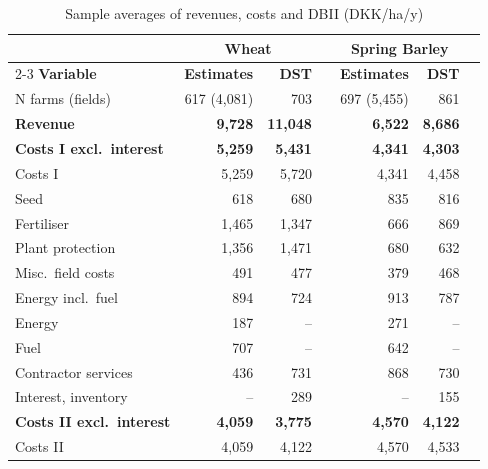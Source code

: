 \documentclass[12pt]{article}
\begin{document}
\begin{table}[H]
\centering
\small
\caption{Sample averages of revenues, costs and DBII (DKK/ha/y)}
\label{tab:dst-comparison}
\begin{threeparttable}
\begin{tabular}{lrrrrrr}
\toprule
 & \multicolumn{2}{c}{\textbf{Wheat}} & &
   \multicolumn{2}{c}{\textbf{Spring Barley}} \\
\cmidrule{2-3}\cmidrule{5-6}
\textbf{Variable} & \textbf{Estimates} & \textbf{DST} & &
                    \textbf{Estimates} & \textbf{DST} \\
\midrule\addlinespace
N farms (fields)                  &  617 (4,081) &   703 & & 697 (5,455) &   861 \\
\addlinespace
\textbf{Revenue}              
& \textbf{9,728} & \textbf{11,048} & &
  \textbf{6,522} & \textbf{8,686} \\
\addlinespace
\textbf{Costs I excl.\ interest}  
& \textbf{5,259} & \textbf{5,431} & &
  \textbf{4,341} & \textbf{4,303} \\
\addlinespace
Costs I                           &       5,259 &  5,720 & &       4,341 &  4,458 \\
\quad Seed                        &         618 &    680 & &         835 &    816 \\
\quad Fertiliser                  &       1,465 &  1,347 & &         666 &    869 \\
\quad Plant protection            &       1,356 &  1,471 & &         680 &    632 \\
\quad Misc.\ field costs          &         491 &    477 & &         379 &    468 \\
\quad Energy incl.\ fuel          &         894 &    724 & &         913 &    787 \\
\quad \quad Energy  &         187 &     -- & &         271 &     -- \\
\quad \quad Fuel                  &         707 &     -- & &         642 &     -- \\
\quad Contractor services         &         436 &    731 & &         868 &    730 \\
\quad Interest, inventory         &          -- &    289 & &          -- &    155 \\
\addlinespace
\textbf{Costs II excl.\ interest} 
& \textbf{4,059} & \textbf{3,775} & &
  \textbf{4,570} & \textbf{4,122} \\
\addlinespace
Costs II                          &       4,059 &  4,122 & &       4,570 &  4,533 \\

\end{tabular}
\end{threeparttable}
\end{table}
\end{document}
